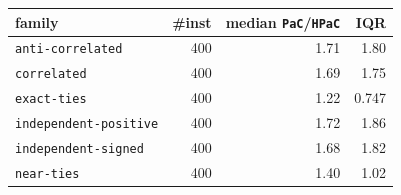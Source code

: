 \begin{tabular}{@{}lrrr@{}}
\toprule
family & \#inst & median \texttt{PaC}/\texttt{HPaC} & IQR \\
\midrule
\texttt{anti-correlated} & 400 & 1.71 & 1.80 \\
\texttt{correlated} & 400 & 1.69 & 1.75 \\
\texttt{exact-ties} & 400 & 1.22 & 0.747 \\
\texttt{independent-positive} & 400 & 1.72 & 1.86 \\
\texttt{independent-signed} & 400 & 1.68 & 1.82 \\
\texttt{near-ties} & 400 & 1.40 & 1.02 \\
\bottomrule
\end{tabular}
